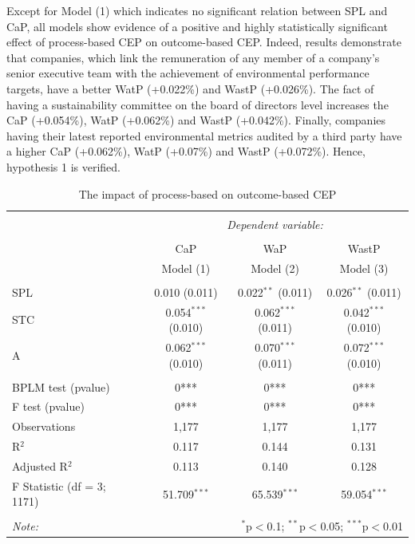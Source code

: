 \documentclass[12pt,]{article}
\begin{document}
Except for Model (1) which indicates no significant relation between SPL
and CaP, all models show evidence of a positive and highly statistically
significant effect of process-based CEP on outcome-based CEP. Indeed,
results demonstrate that companies, which link the remuneration of any
member of a company's senior executive team with the achievement of
environmental performance targets, have a better WatP (+0.022\%) and
WastP (+0.026\%). The fact of having a sustainability committee on the
board of directors level increases the CaP (+0.054\%), WatP (+0.062\%)
and WastP (+0.042\%). Finally, companies having their latest reported
environmental metrics audited by a third party have a higher CaP
(+0.062\%), WatP (+0.07\%) and WastP (+0.072\%). Hence, hypothesis 1 is
verified.

\begin{table}[!] \centering 
  \caption{The impact of process-based on outcome-based CEP} 
  \label{CepResults} 
\begin{tabular}{@{\extracolsep{5pt}}lccc} 
\\[-1.8ex]\hline 
\hline \\[-1.8ex] 
 & \multicolumn{3}{c}{\textit{Dependent variable:}} \\ 
\cline{2-4} 
\\[-1.8ex] & CaP & WaP & WastP \\ 
 & Model (1) & Model (2) & Model (3) \\ 
\hline \\[-1.8ex] 
 SPL & 0.010 (0.011) & 0.022$^{**}$ (0.011) & 0.026$^{**}$ (0.011) \\ 
  STC & 0.054$^{***}$ (0.010) & 0.062$^{***}$ (0.011) & 0.042$^{***}$ (0.010) \\ 
  A & 0.062$^{***}$ (0.010) & 0.070$^{***}$ (0.011) & 0.072$^{***}$ (0.010) \\ 
 \hline \\[-1.8ex] 
BPLM test (pvalue) & 0*** & 0*** & 0*** \\ 
F test (pvalue) & 0*** & 0*** & 0*** \\ 
Observations & 1,177 & 1,177 & 1,177 \\ 
R$^{2}$ & 0.117 & 0.144 & 0.131 \\ 
Adjusted R$^{2}$ & 0.113 & 0.140 & 0.128 \\ 
F Statistic (df = 3; 1171) & 51.709$^{***}$ & 65.539$^{***}$ & 59.054$^{***}$ \\ 
\hline 
\hline \\[-1.8ex] 
\textit{Note:}  & \multicolumn{3}{r}{$^{*}$p$<$0.1; $^{**}$p$<$0.05; $^{***}$p$<$0.01} \\ 
\end{tabular} 
\end{table}
\end{document}
